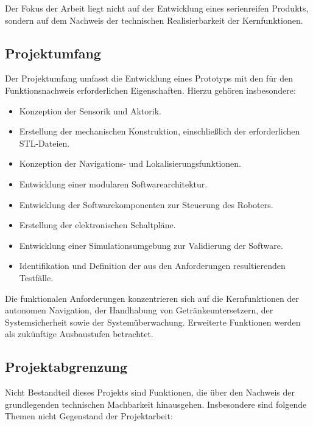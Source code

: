 Der Fokus der Arbeit liegt nicht auf der Entwicklung eines serienreifen
Produkts, sondern auf dem Nachweis der technischen Realisierbarkeit der
Kernfunktionen.

\subsection{Projektumfang}\label{projektumfang}

Der Projektumfang umfasst die Entwicklung eines Prototyps mit den für
den Funktionsnachweis erforderlichen Eigenschaften. Hierzu gehören
insbesondere:

\begin{itemize}
\tightlist
\item
  Konzeption der Sensorik und Aktorik.
\item
  Erstellung der mechanischen Konstruktion, einschließlich der
  erforderlichen STL-Dateien.
\item
  Konzeption der Navigations- und Lokalisierungsfunktionen.
\item
  Entwicklung einer modularen Softwarearchitektur.
\item
  Entwicklung der Softwarekomponenten zur Steuerung des Roboters.
\item
  Erstellung der elektronischen Schaltpläne.
\item
  Entwicklung einer Simulationsumgebung zur Validierung der Software.
\item
  Identifikation und Definition der aus den Anforderungen resultierenden
  Testfälle.
\end{itemize}

Die funktionalen Anforderungen konzentrieren sich auf die Kernfunktionen
der autonomen Navigation, der Handhabung von Getränkeuntersetzern, der
Systemsicherheit sowie der Systemüberwachung. Erweiterte Funktionen
werden als zukünftige Ausbaustufen betrachtet.

\subsection{Projektabgrenzung}\label{projektabgrenzung}

Nicht Bestandteil dieses Projekts sind Funktionen, die über den Nachweis
der grundlegenden technischen Machbarkeit hinausgehen. Insbesondere sind
folgende Themen nicht Gegenstand der Projektarbeit:

